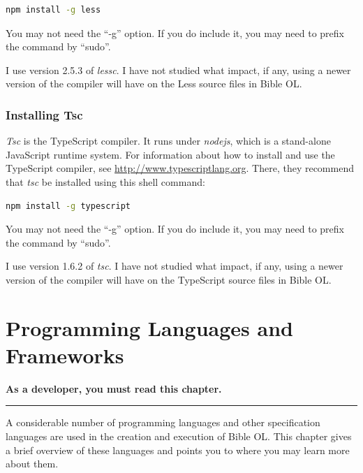 \documentclass[11pt,oneside,a4paper]{memoir}
\begin{document}
\begin{lstlisting}[language=bash]
npm install -g less
\end{lstlisting}
 
You may not need the ``-g'' option. If you do include it, you may need to prefix the command by
``sudo''.
 
I use version 2.5.3 of \emph{lessc}. I have not studied what impact, if any, using a newer version
of the compiler will have on the Less source files in Bible OL.

\subsection{Installing Tsc}\label{sec-installing-tsc}\label{sec-install-end}
 
\emph{Tsc} is the TypeScript compiler. It
runs under \emph{nodejs}, which is a stand-alone JavaScript runtime
system. For information about how to install and use the TypeScript compiler, see
\url{http://www.typescriptlang.org}. There, they recommend that \emph{tsc} be installed using this
shell command:
 
\begin{lstlisting}[language=bash]
npm install -g typescript
\end{lstlisting}
 
You may not need the ``-g'' option. If you do include it, you may need to prefix the command by
``sudo''.
 
I use version 1.6.2 of \emph{tsc}. I have not studied what impact, if any, using a newer version of
the compiler will have on the TypeScript source files in Bible OL.



\chapter{Programming Languages and Frameworks}\label{chap-proglang}

\textbf{As a developer, you must read this chapter.}
\plainbreak{3}

A considerable number of programming languages and other specification languages are used in the
creation and execution of Bible OL. This chapter gives a brief overview of these languages and
points you to where you may learn more about them.
\end{document}
